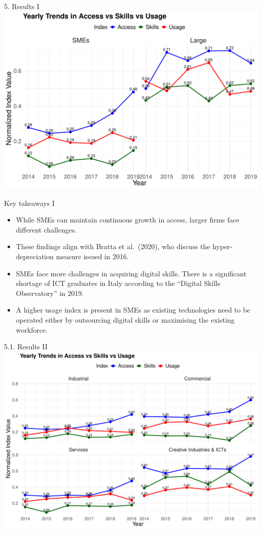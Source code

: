 \documentclass[
  ignorenonframetext,
]{beamer}
\begin{document}
\begin{frame}{5. Results I}
\label{results-i}
\includegraphics{FactoAnalysisDigitalDivide_files/figure-beamer/yearTrendSize-1.pdf}
\end{frame}

\begin{frame}{Key takeaways I}
\label{key-takeaways-i}
\begin{itemize}
\item
  While SMEs can maintain continuous growth in access, larger firms face
  different challenges.
\item
  These findings align with Bratta et al.~(2020), who discuss the
  hyper-depreciation measure issued in 2016.
\item
  SMEs face more challenges in acquiring digital skills. There is a
  significant shortage of ICT graduates in Italy according to the
  ``Digital Skills Observatory'' in 2019.
\item
  A higher usage index is present in SMEs as existing technologies need
  to be operated either by outsourcing digital skills or maximising the
  existing workforce.
\end{itemize}
\end{frame}

\begin{frame}{5.1. Results II}
\label{results-ii}
\includegraphics{FactoAnalysisDigitalDivide_files/figure-beamer/yearTrendMac-1.pdf}
\end{frame}
\end{document}
